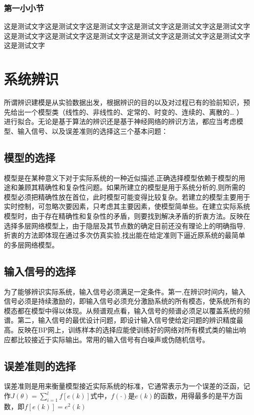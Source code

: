\documentclass[UTF8]{ctexart}
\begin{document}
\subsubsection{第一小小节}
这是测试文字这是测试文字这是测试文字这是测试文字这是测试文字这是测试文字这是测试文字这是测试文字这是测试文字这是测试文字这是测试文字这是测试文字这是测试文字
\section{系统辨识}
所谓辨识建模是从实验数据出发，根据辨识的目的以及对过程已有的验前知识，预先给出一个模型类（线性的、非线性的、定常的、时变的、连续的、离散的… ）进行拟合。无论是基于算法的辨识还是基于神经网络的辨识方法，都应当考虑模型、输入信号、以及误差准则的选择这三个基本问题：
\subsection{模型的选择}
模型是在某种意义下对于实际系统的一种近似描述,正确选择模型依赖于模型的用途和兼顾其精确性和复杂性问题。如果所建立的模型是用于系统分析的,则所需的模型必须把精确性放在首位，此时模型可能变得比较复杂。若建立的模型主要用于实时控制，可忽略次要因素，只考虑其主要因素，使模型简单些。在建立实际系统模型时，由于存在精确性和复杂性的矛盾，则要找到解决矛盾的折衷方法。反映在选择多层网络模型上，由于隐层及其节点数的确定目前还没有理论上的明确指导,折衷的方法即体现在通过多次仿真实验,找出能在给定准则下逼近原系统的最简单的多层网络模型。
\subsection{输入信号的选择}
为了能够辨识实际系统，输入信号必须满足一定条件。第一,在辨识时间内，输入信号必须是持续激励的，即输入信号必须充分激励系统的所有模态，使系统所有的模态都在模型中得以体现。从频谱观点看，输入信号的频谱必须足以覆盖系统的频谱。第二，输入信号的最优设计问题，即设计输入信号使给定问题的辨识精度最高。反映在BP网上，训练样本的选择应能使训练好的网络对所有模式类的输出响应都比较接近于实际输出。常用的输入信号有白噪声或伪随机信号。
\subsection{误差准则的选择}
误差准则是用来衡量模型接近实际系统的标准，它通常表示为一个误差的泛函，记作$ J(\theta)=\sum^l_{i=1}f[e(k)] $式中，$ f(\cdot) $是$ e(k) $的函数，用得最多的是平方函数，即$ f[e(k)]=e^2(k) $
\end{document}
